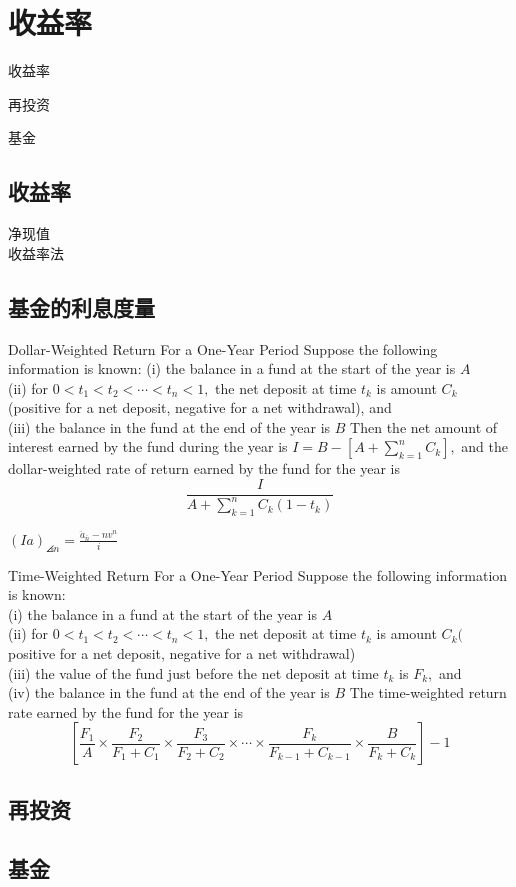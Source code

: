\chapter{收益率}
\begin{introduction}
	\item 收益率
	\item 再投资
	\item 基金
\end{introduction}
\section{收益率}
净现值
\\收益率法
\section{基金的利息度量}
\begin{definition}{Dollar-Weighted Return For a One-Year Period}
\noindent	Suppose the following information is known:
	(i) the balance in a fund at the start of the year is $A$ \\
	(ii) for $0<t_{1}<t_{2}<\cdots<t_{n}<1,$ the net deposit at time $t_{k}$ is amount $C_{k}$ (positive for a net deposit, negative for a net withdrawal), and \\
	(iii) the balance in the fund at the end of the year is $B$
	Then the net amount of interest earned by the fund during the year is $I=B-\left[A+\sum_{k=1}^{n} C_{k}\right],$ and the dollar-weighted rate of return earned by the fund for the year is
	\[
	\frac{I}{A+\sum_{k=1}^{n} C_{k}\left(1-t_{k}\right)}
	\]
\end{definition}
\begin{remark}
	$(Ia)_{\angles{n}}=\frac{\ddot{a}_{\bar{n}}-n v^{n}}{i}$
\end{remark}
\begin{definition}{Time-Weighted Return For a One-Year Period}
\noinent Suppose the following information is known:\\
	(i) the balance in a fund at the start of the year is $A$\\
	(ii) for $0<t_{1}<t_{2}<\cdots<t_{n}<1,$ the net deposit at time $t_{k}$ is amount $C_{k}($ positive for a net deposit, negative for a net withdrawal)\\
	(iii) the value of the fund just before the net deposit at time $t_{k}$ is $F_{k},$ and\\
	(iv) the balance in the fund at the end of the year is $B$
	The time-weighted return rate earned by the fund for the year is
	\[
	\left[\frac{F_{1}}{A} \times \frac{F_{2}}{F_{1}+C_{1}} \times \frac{F_{3}}{F_{2}+C_{2}} \times \cdots \times \frac{F_{k}}{F_{k-1}+C_{k-1}} \times \frac{B}{F_{k}+C_{k}}\right]-1
	\]	
\end{definition}	
\section{再投资}


\section{基金}